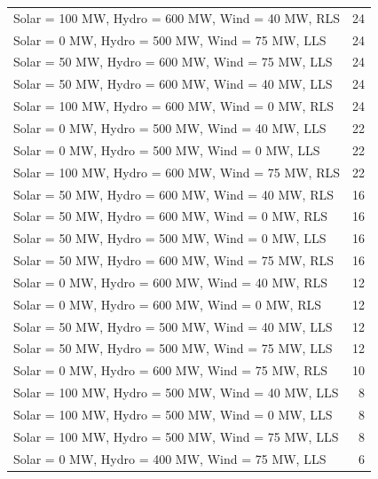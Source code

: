 \documentclass[10pt]{report}
\begin{document}
\begin{table}[H]
{\begin{tabular}{lr}
Solar = 100 MW, Hydro = 600 MW, Wind = 40 MW, RLS & 24 \\
Solar = 0 MW, Hydro = 500 MW, Wind = 75 MW, LLS & 24 \\
Solar = 50 MW, Hydro = 600 MW, Wind = 75 MW, LLS & 24 \\
Solar = 50 MW, Hydro = 600 MW, Wind = 40 MW, LLS & 24 \\
Solar = 100 MW, Hydro = 600 MW, Wind = 0 MW, RLS & 24 \\
Solar = 0 MW, Hydro = 500 MW, Wind = 40 MW, LLS & 22 \\
Solar = 0 MW, Hydro = 500 MW, Wind = 0 MW, LLS & 22 \\
Solar = 100 MW, Hydro = 600 MW, Wind = 75 MW, RLS & 22 \\
Solar = 50 MW, Hydro = 600 MW, Wind = 40 MW, RLS & 16 \\
Solar = 50 MW, Hydro = 600 MW, Wind = 0 MW, RLS & 16 \\
Solar = 50 MW, Hydro = 500 MW, Wind = 0 MW, LLS & 16 \\
Solar = 50 MW, Hydro = 600 MW, Wind = 75 MW, RLS & 16 \\
Solar = 0 MW, Hydro = 600 MW, Wind = 40 MW, RLS & 12 \\
Solar = 0 MW, Hydro = 600 MW, Wind = 0 MW, RLS & 12 \\
Solar = 50 MW, Hydro = 500 MW, Wind = 40 MW, LLS & 12 \\
Solar = 50 MW, Hydro = 500 MW, Wind = 75 MW, LLS & 12 \\
Solar = 0 MW, Hydro = 600 MW, Wind = 75 MW, RLS & 10 \\
Solar = 100 MW, Hydro = 500 MW, Wind = 40 MW, LLS & 8 \\
Solar = 100 MW, Hydro = 500 MW, Wind = 0 MW, LLS & 8 \\
Solar = 100 MW, Hydro = 500 MW, Wind = 75 MW, LLS & 8 \\
Solar = 0 MW, Hydro = 400 MW, Wind = 75 MW, LLS & 6 \\
\bottomrule
\end{tabular}}
\end{table}
\end{document}
